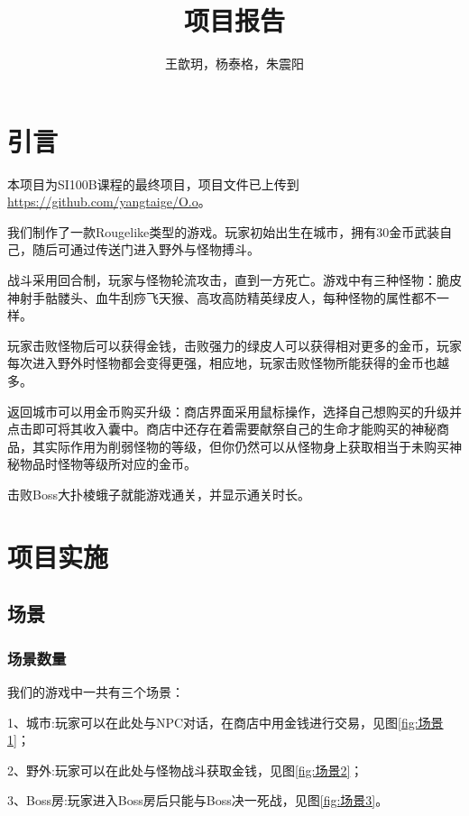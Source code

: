 \documentclass{ctexart}
\title{项目报告}
\author{王歆玥，杨泰格，朱震阳}
\begin{document}
\maketitle

\section{引言}

本项目为SI100B课程的最终项目，项目文件已上传到\href{https://github.com/yangtaige/O.o}{https://github.com/yangtaige/O.o}。

我们制作了一款Rougelike类型的游戏。玩家初始出生在城市，拥有30金币武装自己，随后可通过传送门进入野外与怪物搏斗。

战斗采用回合制，玩家与怪物轮流攻击，直到一方死亡。游戏中有三种怪物：脆皮神射手骷髅头、血牛刮痧飞天猴、高攻高防精英绿皮人，每种怪物的属性都不一样。
    
玩家击败怪物后可以获得金钱，击败强力的绿皮人可以获得相对更多的金币，玩家每次进入野外时怪物都会变得更强，相应地，玩家击败怪物所能获得的金币也越多。
    
返回城市可以用金币购买升级：商店界面采用鼠标操作，选择自己想购买的升级并点击即可将其收入囊中。商店中还存在着需要献祭自己的生命才能购买的神秘商品，其实际作用为削弱怪物的等级，但你仍然可以从怪物身上获取相当于未购买神秘物品时怪物等级所对应的金币。
    
击败Boss大扑棱蛾子就能游戏通关，并显示通关时长。

\section{项目实施}

\subsection{场景}
\subsubsection{场景数量}
我们的游戏中一共有三个场景：

1、城市:玩家可以在此处与NPC对话，在商店中用金钱进行交易，见图\ref{fig:场景1}；

2、野外:玩家可以在此处与怪物战斗获取金钱，见图\ref{fig:场景2}；

3、Boss房:玩家进入Boss房后只能与Boss决一死战，见图\ref{fig:场景3}。
\end{document}
